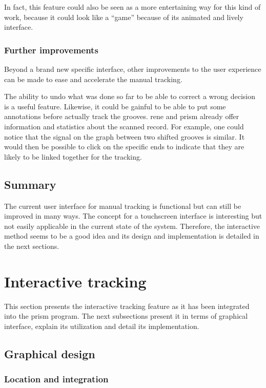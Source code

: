 In fact, this feature could also be seen as a more entertaining way for this kind of work, because it could look like a ``game'' because of its animated and lively interface.

\subsubsection{Further improvements}

Beyond a brand new specific interface, other improvements to the user experience can be made to ease and accelerate the manual tracking.

The ability to undo what was done so far to be able to correct a wrong decision is a useful feature. Likewise, it could be gainful to be able to put some annotations before actually track the grooves. \gls{rene} and \gls{prism} already offer information and statistics about the scanned record. For example, one could notice that the signal on the graph between two shifted grooves is similar. It would then be possible to click on the specific ends to indicate that they are likely to be linked together for the tracking.

\subsection{Summary}

The current user interface for manual tracking is functional but can still be improved in many ways. The concept for a touchscreen interface is interesting but not easily applicable in the current state of the system. Therefore, the interactive method seems to be a good idea and its design and implementation is detailed in the next sections.

\section{Interactive tracking}
\label{sec:inttracking}

This section presents the interactive tracking feature as it has been integrated into the \gls{prism} program. The next subsections present it in terms of graphical interface, explain its utilization and detail its implementation.

\subsection{Graphical design}

\subsubsection{Location and integration}

